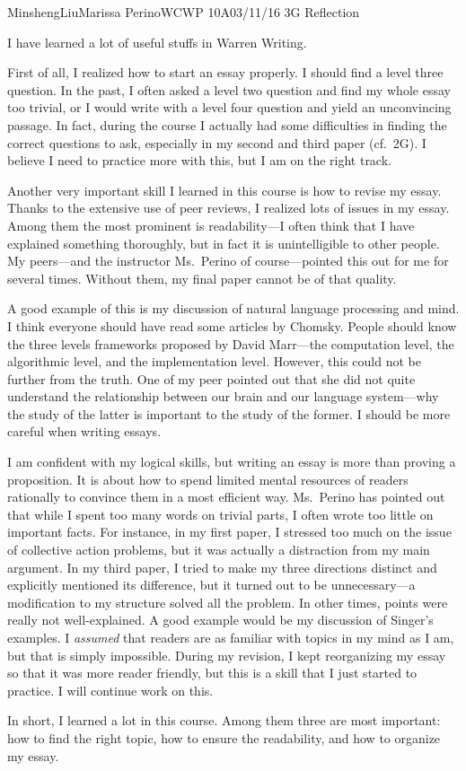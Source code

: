 \documentclass[12pt,letterpaper]{article}
\begin{document}
\begin{mla}{Minsheng}{Liu}{Marissa Perino}{WCWP 10A}{03/11/16}
  {3G Reflection}

I have learned a lot of useful stuffs in Warren Writing.

First of all, I realized how to start an essay properly. I should find a
level three question. In the past, I often asked a level two question
and find my whole essay too trivial, or I would write with a level four
question and yield an unconvincing passage. In fact, during the course I
actually had some difficulties in finding the correct questions to ask,
especially in my second and third paper (cf.~2G). I believe I need to
practice more with this, but I am on the right track.

Another very important skill I learned in this course is how to revise
my essay. Thanks to the extensive use of peer reviews, I realized lots
of issues in my essay. Among them the most prominent is readability---I
often think that I have explained something thoroughly, but in fact it
is unintelligible to other people. My peers---and the instructor
Ms.~Perino of course---pointed this out for me for several times.
Without them, my final paper cannot be of that quality.

A good example of this is my discussion of natural language processing
and mind. I think everyone should have read some articles by Chomsky.
People should know the three levels frameworks proposed by David
Marr---the computation level, the algorithmic level, and the
implementation level. However, this could not be further from the truth.
One of my peer pointed out that she did not quite understand the
relationship between our brain and our language system---why the study
of the latter is important to the study of the former. I should be more
careful when writing essays.

I am confident with my logical skills, but writing an essay is more than
proving a proposition. It is about how to spend limited mental resources
of readers rationally to convince them in a most efficient way.
Ms.~Perino has pointed out that while I spent too many words on trivial
parts, I often wrote too little on important facts. For instance, in my
first paper, I stressed too much on the issue of collective action
problems, but it was actually a distraction from my main argument. In my
third paper, I tried to make my three directions distinct and explicitly
mentioned its difference, but it turned out to be unnecessary---a
modification to my structure solved all the problem. In other times,
points were really not well-explained. A good example would be my
discussion of Singer's examples. I \emph{assumed} that readers are as
familiar with topics in my mind as I am, but that is simply impossible.
During my revision, I kept reorganizing my essay so that it was more
reader friendly, but this is a skill that I just started to practice. I
will continue work on this.

In short, I learned a lot in this course. Among them three are most
important: how to find the right topic, how to ensure the readability,
and how to organize my essay.

\end{mla}
\end{document}
